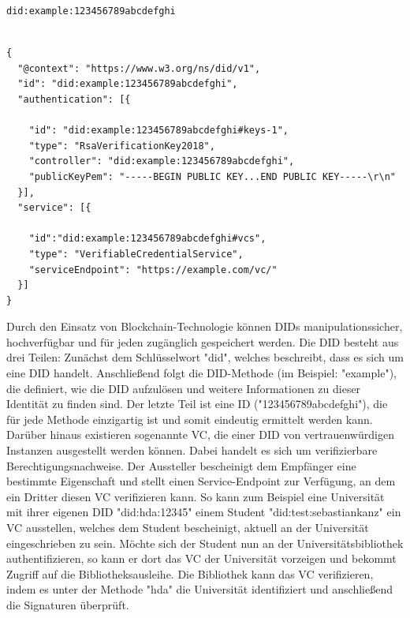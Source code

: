 \begin{lstlisting}[caption=Beispiel einer DID,label=listing:did]
did:example:123456789abcdefghi
\end{lstlisting}

\begin{lstlisting}[caption=Beispiel eines DID-Dokuments,label=listing:did_document]

{
  "@context": "https://www.w3.org/ns/did/v1",
  "id": "did:example:123456789abcdefghi",
  "authentication": [{

    "id": "did:example:123456789abcdefghi#keys-1",
    "type": "RsaVerificationKey2018",
    "controller": "did:example:123456789abcdefghi",
    "publicKeyPem": "-----BEGIN PUBLIC KEY...END PUBLIC KEY-----\r\n"
  }],
  "service": [{

    "id":"did:example:123456789abcdefghi#vcs",
    "type": "VerifiableCredentialService",
    "serviceEndpoint": "https://example.com/vc/"
  }]
}
\end{lstlisting}

Durch den Einsatz von Blockchain-Technologie können \ac{DID}s manipulationssicher, hochverfügbar und für jeden zugänglich gespeichert werden. Die \ac{DID} besteht aus drei Teilen: Zunächst dem Schlüsselwort "did", welches beschreibt, dass es sich um eine \ac{DID} handelt. Anschließend folgt die DID-Methode (im Beispiel: "example"), die definiert, wie die \ac{DID} aufzulösen und weitere Informationen zu dieser Identität zu finden sind. Der letzte Teil ist eine ID ("123456789abcdefghi"), die für jede Methode einzigartig ist und somit eindeutig ermittelt werden kann.\\
Darüber hinaus existieren sogenannte \ac{VC}, die einer \ac{DID} von vertrauenwürdigen Instanzen ausgestellt werden können. Dabei handelt es sich um verifizierbare Berechtigungsnachweise. Der Aussteller bescheinigt dem Empfänger eine bestimmte Eigenschaft und stellt einen Service-Endpoint zur Verfügung, an dem ein Dritter diesen \ac{VC} verifizieren kann. So kann zum Beispiel eine Universität mit ihrer eigenen \ac{DID} "did:hda:12345" einem Student "did:test:sebastiankanz" ein \ac{VC} ausstellen, welches dem Student bescheinigt, aktuell an der Universität eingeschrieben zu sein. Möchte sich der Student nun an der Universitätsbibliothek authentifizieren, so kann er dort das \ac{VC} der Universität vorzeigen und bekommt Zugriff auf die Bibliotheksausleihe. Die Bibliothek kann das \ac{VC} verifizieren, indem es unter der Methode "hda" die Universität identifiziert und anschließend die Signaturen überprüft.


